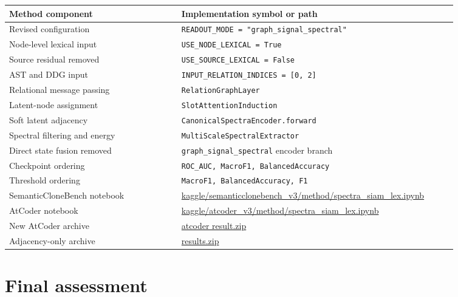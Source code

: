\documentclass[11pt,a4paper]{article}
\newcommand{\code}[1]{\texttt{#1}}
\begin{document}
\begin{longtable}{p{0.35\linewidth}p{0.57\linewidth}}
\toprule
Method component & Implementation symbol or path \\
\midrule
\endhead
Revised configuration & \code{READOUT\_MODE = "graph\_signal\_spectral"} \\
Node-level lexical input & \code{USE\_NODE\_LEXICAL = True} \\
Source residual removed & \code{USE\_SOURCE\_LEXICAL = False} \\
AST and DDG input & \code{INPUT\_RELATION\_INDICES = [0, 2]} \\
Relational message passing & \code{RelationGraphLayer} \\
Latent-node assignment & \code{SlotAttentionInduction} \\
Soft latent adjacency & \code{CanonicalSpectraEncoder.forward} \\
Spectral filtering and energy & \code{MultiScaleSpectralExtractor} \\
Direct state fusion removed & \code{graph\_signal\_spectral} encoder branch \\
Checkpoint ordering & \code{ROC\_AUC, MacroF1, BalancedAccuracy} \\
Threshold ordering & \code{MacroF1, BalancedAccuracy, F1} \\
SemanticCloneBench notebook & \url{kaggle/semanticclonebench_v3/method/spectra_siam_lex.ipynb} \\
AtCoder notebook & \url{kaggle/atcoder_v3/method/spectra_siam_lex.ipynb} \\
New AtCoder archive & \url{atcoder result.zip} \\
Adjacency-only archive & \url{results.zip} \\
\bottomrule
\end{longtable}

\section{Final assessment}
\end{document}

